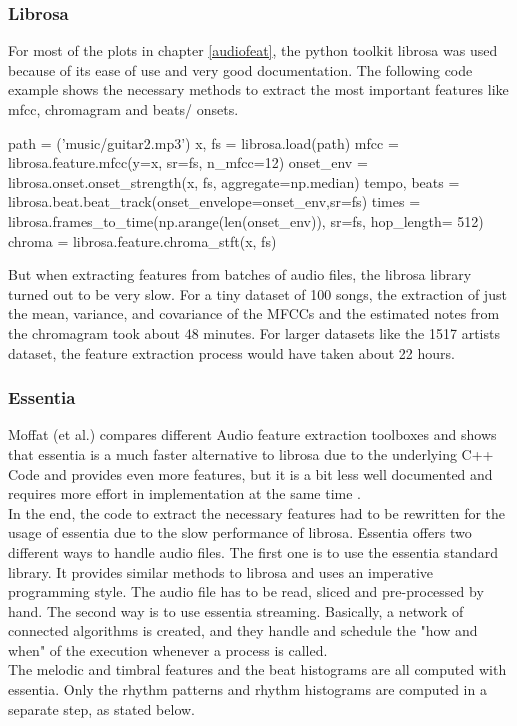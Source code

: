 \subsubsection{Librosa}

For most of the plots in chapter \ref{audiofeat}, the python toolkit librosa was used because of its ease of use and very good documentation. The following code example shows the necessary methods to extract the most important features like mfcc, chromagram and beats/ onsets.
\lstset{language=Python} 
\begin{pythonCode}[frame=single,label={lst:librosa},caption={librosa},captionpos=b]
path = ('music/guitar2.mp3')
x, fs = librosa.load(path)
mfcc = librosa.feature.mfcc(y=x, sr=fs, n_mfcc=12)
onset_env = librosa.onset.onset_strength(x, fs, aggregate=np.median)
tempo, beats = librosa.beat.beat_track(onset_envelope=onset_env,sr=fs)
times = librosa.frames_to_time(np.arange(len(onset_env)), sr=fs, hop_length= 512)
chroma = librosa.feature.chroma_stft(x, fs)
\end{pythonCode}	
But when extracting features from batches of audio files, the librosa library turned out to be very slow. For a tiny dataset of 100 songs, the extraction of just the mean, variance, and covariance of the MFCCs and the estimated notes from the chromagram took about 48 minutes. 
For larger datasets like the 1517 artists dataset, the feature extraction process would have taken about 22 hours. 

\subsubsection{Essentia}

Moffat (et al.) compares different Audio feature extraction toolboxes and shows that essentia is a much faster alternative to librosa due to the underlying C++ Code and provides even more features, but it is a bit less well documented and requires more effort in implementation at the same time \cite{audiofeattoolb}.\\ 
In the end, the code to extract the necessary features had to be rewritten for the usage of essentia due to the slow performance of librosa. Essentia offers two different ways to handle audio files. The first one is to use the essentia standard library. It provides similar methods to librosa and uses an imperative programming style. The audio file has to be read, sliced and pre-processed by hand. The second way is to use essentia streaming. Basically, a network of connected algorithms is created, and they handle and schedule the "how and when" of the execution whenever a process is called. \\
The melodic and timbral features and the beat histograms are all computed with essentia. Only the rhythm patterns and rhythm histograms are computed in a separate step, as stated below. 

